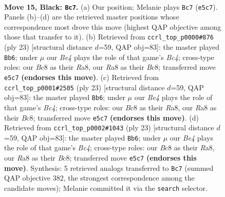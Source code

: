 \documentclass[11pt]{article}
\begin{document}
\clearpage

\begin{figure}[p]\centering
\begin{subfigure}{0.46\textwidth}\centering
\resizebox{\linewidth}{!}{%
\newchessgame
\chessboard[
  setfen={r1bq1rk1/pp3ppp/6n1/3pb3/B7/3P1N1P/PPP2PP1/R1BQR1K1 b - - 4 15},
  showmover=false,
  pgfstyle=straightmove, color=movearrow, markmove={e5-c7}
]}
\caption{}
\end{subfigure}\hfill
\begin{subfigure}{0.46\textwidth}\centering
\resizebox{\linewidth}{!}{%
\newchessgame
\chessboard[
  setfen={r1bq1rk1/pp3ppp/2n5/2bp4/8/P1Q2NP1/1PP2PBP/R1B2RK1 b - - 0 12},
  showmover=false,
  pgfstyle=straightmove, color=movearrow, markmove={c5-b6}
]}
\caption{}
\end{subfigure}
\\[4pt]
\begin{subfigure}{0.46\textwidth}\centering
\resizebox{\linewidth}{!}{%
\newchessgame
\chessboard[
  setfen={r1bq1rk1/pp3ppp/2n5/2bp4/8/P1Q2NP1/1PP2PBP/R1B2RK1 b - - 0 12},
  showmover=false,
  pgfstyle=straightmove, color=movearrow, markmove={c5-b6}
]}
\caption{}
\end{subfigure}\hfill
\begin{subfigure}{0.46\textwidth}\centering
\resizebox{\linewidth}{!}{%
\newchessgame
\chessboard[
  setfen={r1bq1rk1/pp3ppp/2n5/2bp4/8/P1Q2NP1/1PP2PBP/R1B2RK1 b - - 0 12},
  showmover=false,
  pgfstyle=straightmove, color=movearrow, markmove={c5-b6}
]}
\caption{}
\end{subfigure}
\caption{\textbf{Move 15, Black: \texttt{Bc7}.} (a) Our position; Melanie plays \texttt{Bc7} (\texttt{e5c7}). Panels (b)--(d) are the retrieved master positions whose correspondence most drove this move (highest QAP objective among those that transfer to it). (b) Retrieved from \texttt{ccrl\_top\_p0000\#876} (ply 23) [structural distance $d$=59, QAP obj=83]: the master played \texttt{Bb6}; under $\mu$ our \emph{Be4} plays the role of that game's \emph{Bc4}; cross-type roles: our \emph{B}c8 as their \emph{R}a8, our \emph{R}a8 as their \emph{B}c8; transferred move \texttt{e5c7} \textbf{(endorses this move)}. (c) Retrieved from \texttt{ccrl\_top\_p0001\#2505} (ply 23) [structural distance $d$=59, QAP obj=83]: the master played \texttt{Bb6}; under $\mu$ our \emph{Be4} plays the role of that game's \emph{Bc4}; cross-type roles: our \emph{B}c8 as their \emph{R}a8, our \emph{R}a8 as their \emph{B}c8; transferred move \texttt{e5c7} \textbf{(endorses this move)}. (d) Retrieved from \texttt{ccrl\_top\_p0002\#1043} (ply 23) [structural distance $d$=59, QAP obj=83]: the master played \texttt{Bb6}; under $\mu$ our \emph{Be4} plays the role of that game's \emph{Bc4}; cross-type roles: our \emph{B}c8 as their \emph{R}a8, our \emph{R}a8 as their \emph{B}c8; transferred move \texttt{e5c7} \textbf{(endorses this move)}. Synthesis: 5 retrieved analogs transferred to \texttt{Bc7} (summed QAP objective 382, the strongest correspondence among the candidate moves); Melanie committed it via the \texttt{search} selector.}
\label{fig:thought-m29}
\end{figure}
\end{document}

